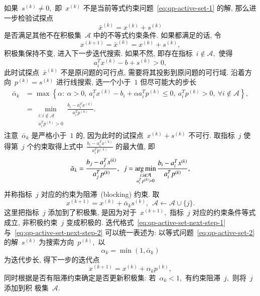 如果~${s}^{(k)} \neq {0},$ 即~${x}^{(k)}$ 不是当前等式约束问题~\eqref{eq:qp-active-set-1} 的解, 那么进一步检验试探点
\begin{equation}
\label{eq:qp-active-set-test-point}
\bar{{x}}^{(k)} = {x}^{(k)} + {s}^{(k)}
\end{equation}
是否满足其他不在积极集~$\mathcal{A}$ 中的不等式约束条件. 如果都满足的话, 令
\begin{equation}
\label{eq:qp-active-set-next-step-1}
{x}^{(k+1)} = \bar{{x}}^{(k)} = {x}^{(k)} + {s}^{(k)},
\end{equation}
积极集保持不变, 进入下一步迭代搜索. 如果不然, 即存在指标~$i \not\in \mathcal{A},$ 使得
\begin{equation*}
{a}_i^T {x}^{(k)} - {b} + {s}^{(k)} > 0,
\end{equation*}
此时试探点~$\bar{{x}}^{(k)}$ 不是原问题的可行点, 需要将其投影到原问题的可行域.
沿着方向~${p}^{(k)} = {s}^{(k)}$ 进行线搜索, 选一个小于~$1$ 但尽可能大的步长
\begin{equation}
\label{eq:qp-active-set-step-len-1}
\begin{aligned}
\bar{\alpha}_k & = \max \left\{ \alpha : ~ \alpha > 0, ~ {a}_i^T {x}^{(k)} - b_i + \alpha {a}_i^T {p}^{(k)} \leqslant 0, ~ {a}_i^T {p}^{(k)} > 0, ~ \forall i \not\in \mathcal{A} \right\}, \\
& = \min_{\substack{i: i \not\in \mathcal{A} \\ {a}_i^T {p}^{(k)} > 0}} \frac{b_i - {a}_i^T {x}^{(k)}}{{a}_i^T {p}^{(k)}}.
\end{aligned}
\end{equation}
注意~$\bar{\alpha}_k$ 是严格小于~$1$ 的, 因为此时的试探点~${x}^{(k)} + {s}^{(k)}$ 不可行. 取指标~$j$ 使得第~$j$ 个约束取得上式中~$\frac{b_i - {a}_i^T {x}^{(k)}}{{a}_i^T {p}^{(k)}}$ 的最大值, 即
\begin{equation}
\label{eq:qp-active-set-step-len-2}
\bar{\alpha}_k = \frac{b_j - {a}_j^T {x}^{(k)}}{{a}_j^T {p}^{(k)}}, ~~ j = \operatorname*{arg\,min}_{\substack{i: i \not\in \mathcal{A} \\ {a}_i^T {p}^{(k)} > 0}} \frac{b_i - {a}_i^T {x}^{(k)}}{{a}_i^T {p}^{(k)}},
\end{equation}
并称指标~$j$ 对应的约束为阻滞~(blocking) 约束. 取
\begin{equation}
\label{eq:qp-active-set-next-step-2}
{x}^{(k+1)} = {x}^{(k)} + \bar{\alpha}_k {s}^{(k)}, ~~ \mathcal{A} \gets \mathcal{A} \cup \{ j \}.
\end{equation}
这里把指标~$j$ 添加到了积极集, 是因为对于~${x}^{(k+1)},$ 指标~$j$ 对应的约束条件等式成立, 非积极约束~$j$ 变成积极的. 迭代格式~\eqref{eq:qp-active-set-next-step-1}
与~\eqref{eq:qp-active-set-next-step-2} 可以统一表述为: 以等式问题~\eqref{eq:qp-active-set-2}
的解~${s}^{(k)}$ 为搜索方向~${p}^{(k)},$ 以
\begin{equation}
\label{eq:qp-active-set-step-len-uniform}
\alpha_k = \min (1, \bar{\alpha}_k)
\end{equation}
为迭代步长, 得下一步的迭代点
\begin{equation}
\label{eq:qp-active-set-next-step-uniform}
{x}^{(k+1)} = {x}^{(k)} + \alpha_k {p}^{(k)},
\end{equation}
同时根据是否有阻滞约束确定是否更新积极集: 若~$\alpha_k < 1,$ 有约束阻滞~$j,$ 则将~$j$ 添加到积
极集~$\mathcal{A}.$

